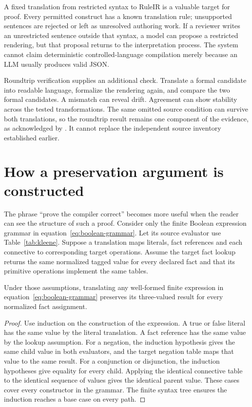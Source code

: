 A fixed translation from restricted syntax to RuleIR is a valuable target for
proof. Every permitted construct has a known translation rule; unsupported
sentences are rejected or left as unresolved authoring work. If a reviewer
writes an unrestricted sentence outside that syntax, a model can propose a
restricted rendering, but that proposal returns to the interpretation process.
The system cannot claim deterministic controlled-language compilation merely
because an LLM usually produces valid JSON.

Roundtrip verification supplies an additional check. Translate a formal
candidate into readable language, formalize the rendering again, and compare
the two formal candidates. A mismatch can reveal drift. Agreement can show
stability across the tested transformations. The same omitted source condition
can survive both translations, so the roundtrip result remains one component
of the evidence, as acknowledged by \citet[method and limitations]{roundtrip2026}.
It cannot replace the independent source inventory established earlier.

\section{How a preservation argument is constructed}
\label{merge:M03:08}

\label{sec:proof-induction}
The phrase ``prove the compiler correct'' becomes more useful when the reader
can see the structure of such a proof. Consider only the finite Boolean
expression grammar in equation~\eqref{eq:boolean-grammar}. Let its source
evaluator use Table~\ref{tab:kleene}. Suppose a translation maps literals,
fact references and each connective to corresponding target operations.
Assume the target fact lookup returns the same normalized tagged value for
every declared fact and that its primitive operations implement the same
tables.

\begin{proposition}
Under those assumptions, translating any well-formed finite expression in
equation~\eqref{eq:boolean-grammar} preserves its three-valued result for every
normalized fact assignment.
\label{prop:boolean-preservation}
\end{proposition}
\begin{proof}
Use induction on the construction of the expression. A true or false literal
has the same value by the literal translation. A fact reference has the same
value by the lookup assumption. For a negation, the induction hypothesis gives
the same child value in both evaluators, and the target negation table maps
that value to the same result. For a conjunction or disjunction, the induction
hypotheses give equality for every child. Applying the identical connective
table to the identical sequence of values gives the identical parent value.
These cases cover every constructor in the grammar. The finite syntax tree
ensures the induction reaches a base case on every path.
\end{proof}

